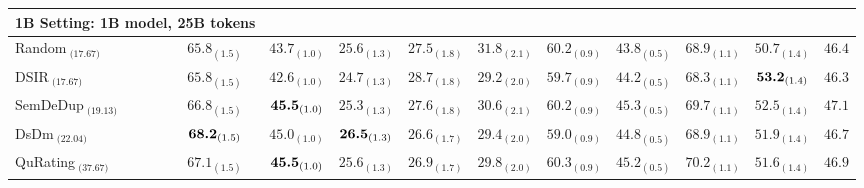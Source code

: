 \begin{table}
\begin{sc}
{\begin{tabular}{l|cccccccccc}
\multicolumn{2}{l}{\textbf{1B Setting:} 1B model, 25B tokens}\\
\midrule
Random$_\text{ (17.67)}$ & $\text{65.8}_{(\text{1.5})}$ & $\text{43.7}_{(\text{1.0})}$ & $\text{25.6}_{(\text{1.3})}$ & $\text{27.5}_{(\text{1.8})}$ & $\text{31.8}_{(\text{2.1})}$ & $\text{60.2}_{(\text{0.9})}$ & $\text{43.8}_{(\text{0.5})}$ & $\text{68.9}_{(\text{1.1})}$ & $\text{50.7}_{(\text{1.4})}$ & $\text{46.4}$ \\
DSIR$_\text{ (17.67)}$ & $\text{65.8}_{(\text{1.5})}$ & $\text{42.6}_{(\text{1.0})}$ & $\text{24.7}_{(\text{1.3})}$ & $\text{28.7}_{(\text{1.8})}$ & $\text{29.2}_{(\text{2.0})}$ & $\text{59.7}_{(\text{0.9})}$ & $\text{44.2}_{(\text{0.5})}$ & $\text{68.3}_{(\text{1.1})}$ & $\text{\textbf{53.2}}_{(\text{1.4})}$ & $\text{46.3}$ \\
SemDeDup$_\text{ (19.13)}$ & $\text{66.8}_{(\text{1.5})}$ & $\text{\textbf{45.5}}_{(\text{1.0})}$ & $\text{25.3}_{(\text{1.3})}$ & $\text{27.6}_{(\text{1.8})}$ & $\text{30.6}_{(\text{2.1})}$ & $\text{60.2}_{(\text{0.9})}$ & $\text{45.3}_{(\text{0.5})}$ & $\text{69.7}_{(\text{1.1})}$ & $\text{52.5}_{(\text{1.4})}$ & $\text{47.1}$ \\
DsDm$_\text{ (22.04)}$ & $\text{\textbf{68.2}}_{(\text{1.5})}$ & $\text{45.0}_{(\text{1.0})}$ & $\text{\textbf{26.5}}_{(\text{1.3})}$ & $\text{26.6}_{(\text{1.7})}$ & $\text{29.4}_{(\text{2.0})}$ & $\text{59.0}_{(\text{0.9})}$ & $\text{44.8}_{(\text{0.5})}$ & $\text{68.9}_{(\text{1.1})}$ & $\text{51.9}_{(\text{1.4})}$ & $\text{46.7}$ \\
QuRating$_\text{ (37.67)}$ & $\text{67.1}_{(\text{1.5})}$ & $\text{\textbf{45.5}}_{(\text{1.0})}$ & $\text{25.6}_{(\text{1.3})}$ & $\text{26.9}_{(\text{1.7})}$ & $\text{29.8}_{(\text{2.0})}$ & $\text{60.3}_{(\text{0.9})}$ & $\text{45.2}_{(\text{0.5})}$ & $\text{70.2}_{(\text{1.1})}$ & $\text{51.6}_{(\text{1.4})}$ & $\text{46.9}$ \\

\end{tabular}}
\end{sc}
\end{table}
